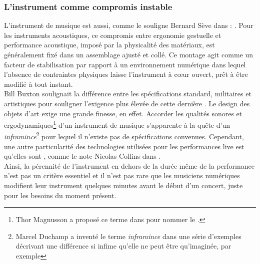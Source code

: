 	
\subsubsection{L'instrument comme compromis instable}

\noindent L'instrument de musique est aussi, comme le souligne Bernard Sève dans \cite{seve_instrument_2013} : . Pour les instruments acoustiques, ce compromis entre ergonomie gestuelle et performance acoustique, imposé par la physicalité des matériaux, est généralement fixé dans un assemblage ajusté et collé. Ce montage agit comme un facteur de stabilisation par rapport à un environnement numérique dans lequel l'absence de contraintes physiques laisse l'instrument à cœur ouvert, prêt à être modifié à tout instant.\\
\indent Bill Buxton soulignait la différence entre les spécifications standard, militaires et artistiques pour souligner l'exigence plus élevée de cette dernière \cite{buxton_artists_1997}. Le design des objets d'art exige une grande finesse, en effet. Accorder les qualités sonores et ergodynamiques\footnote{Thor Magnusson a proposé ce terme dans \cite{magnusson_ergodynamics_2019} pour nommer le .} d'un instrument de musique s'apparente à la quête d'un \textit{inframince}\footnote{\label{fn:inframince}Marcel Duchamp \cite{duchamp_notes_2008} a inventé le terme \textit{inframince} dans une série d'exemples décrivant une différence si infime qu'elle ne peut être qu'imaginée, par exemple } pour lequel il n'existe pas de spécifications convenues. Cependant, une autre particularité des technologies utilisées pour les performances live est qu'elles sont , comme le note Nicolas Collins dans \cite{collins_semiconducting_2013}.\\
\indent Ainsi, la pérennité de l'instrument en dehors de la durée même de la performance n'est pas un critère essentiel et il n'est pas rare que les musiciens numériques modifient leur instrument quelques minutes avant le début d'un concert, juste pour les besoins du moment présent.

